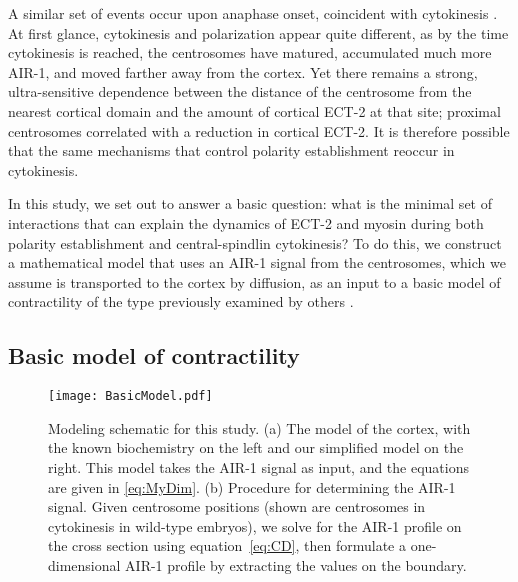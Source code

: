 \documentclass[11pt]{article}
\begin{document}
A similar set of events occur upon anaphase onset, coincident with cytokinesis \citep{longhini2022aurora}. At first glance, cytokinesis and polarization appear quite different, as by the time cytokinesis is reached, the centrosomes have matured,  accumulated much more \mbox{AIR-1}, and moved farther away from the cortex. Yet there remains a strong, ultra-sensitive dependence between the distance of the centrosome from the nearest cortical domain and the amount of cortical ECT-2 at that site; proximal centrosomes correlated with a reduction in cortical ECT-2. It is therefore possible that the same mechanisms that control polarity establishment reoccur in cytokinesis. 

In this study, we set out to answer a basic question: what is the minimal set of interactions that can explain the dynamics of ECT-2 and myosin during both polarity establishment and central-spindlin cytokinesis? To do this, we construct a mathematical model that uses an AIR-1 signal from the centrosomes, which we assume is transported to the cortex by diffusion, as an input to a basic model of contractility of the type previously examined by others \citep{michaux2018excitable,michaud2022versatile}. 

\subsection{Basic model of contractility}

\begin{figure}
\centering
\texttt{[image: BasicModel.pdf]}
\caption{\label{fig:ModelSch}Modeling schematic for this study. (a) The model of the cortex, with the known biochemistry on the left and our simplified model on the right. This model takes the AIR-1 signal as input, and the equations are given in \eqref{eq:MyDim}. (b) Procedure for determining the AIR-1 signal. Given centrosome positions (shown are centrosomes in cytokinesis in wild-type embryos), we solve for the AIR-1 profile on the cross section using equation\ \eqref{eq:CD}, then formulate a one-dimensional AIR-1 profile by extracting the values on the boundary.}
\end{figure}
\end{document}
